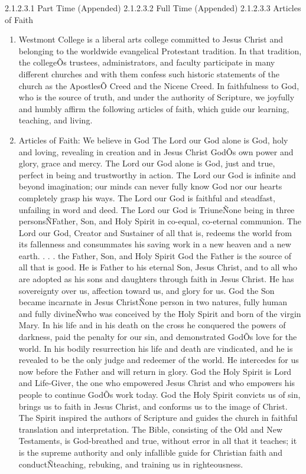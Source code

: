 \documentclass[letterpaper, 11pt]{article}
\begin{document}
				2.1.2.3.1 Part Time (Appended)
				2.1.2.3.2 Full Time (Appended)
				2.1.2.3.3 Articles of Faith
				\begin{enumerate}[label=\alph*)]
					\item{Westmont College is a liberal arts college committed to Jesus Christ and belonging to the worldwide evangelical Protestant tradition.  In that tradition, the collegeÕs trustees, administrators, and faculty participate in many different churches and with them confess such historic statements of the church as the ApostlesÕ Creed and the Nicene Creed. In faithfulness to God, who is the source of truth, and under the authority of Scripture, we joyfully and humbly affirm the following articles of faith, which guide our learning, teaching, and living.}
					\item{Articles of Faith:}
					We believe in God
					The Lord our God alone is God, holy and loving, revealing in creation and in Jesus Christ GodÕs own power and glory, grace and mercy. The Lord our God alone is God, just and true, perfect in being and trustworthy in action.
					The Lord our God is infinite and beyond imagination; our minds can never fully know God nor our hearts completely grasp his ways. The Lord our God is faithful and steadfast, unfailing in word and deed.
					The Lord our God is TriuneÑone being in three personsÑFather, Son, and Holy Spirit in co-equal, co-eternal communion. The Lord our God, Creator and Sustainer of all that is, redeems the world from its fallenness and consummates his saving work in a new heaven and a new earth.
					. . . the Father, Son, and Holy Spirit
					God the Father is the source of all that is good. He is Father to his eternal Son, Jesus Christ, and to all who are adopted as his sons and daughters through faith in Jesus Christ. He has sovereignty over us, affection toward us, and glory for us.
					God the Son became incarnate in Jesus ChristÑone person in two natures, fully human and fully divineÑwho was conceived by the Holy Spirit and born of the virgin Mary. In his life and in his death on the cross he conquered the powers of darkness, paid the penalty for our sin, and demonstrated GodÕs love for the world.  In his bodily resurrection his life and death are vindicated, and he is revealed to be the only judge and redeemer of the world. He intercedes for us now before the Father and will return in glory.
					God the Holy Spirit is Lord and Life-Giver, the one who empowered Jesus Christ and who empowers his people to continue GodÕs work today. God the Holy Spirit convicts us of sin, brings us to faith in Jesus Christ, and conforms us to the image of Christ. The Spirit inspired the authors of  Scripture and guides the church in faithful translation and interpretation. The Bible, consisting of the Old and New Testaments, is God-breathed and true, without error in all that it teaches; it is the supreme authority and only infallible guide for Christian faith and conductÑteaching, rebuking, and training us in righteousness.

\end{enumerate}
\end{document}
